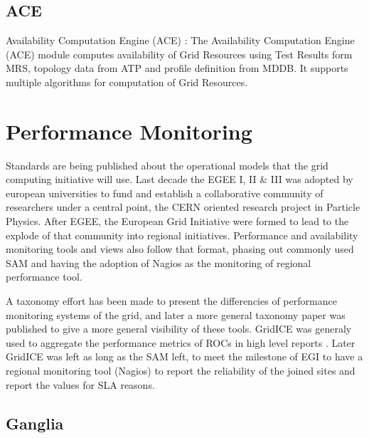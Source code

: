 \subsection{ACE}
Availability Computation Engine (ACE) : The Availability Computation Engine
(ACE) module computes availability of Grid Resources using Test Results form
MRS, topology data from ATP and profile definition from MDDB. It supports
multiple algorithms for computation of Grid Resources.



\section{Performance Monitoring}
Standards are being published about the operational models that the grid
computing initiative will use. Last decade the EGEE I, II \& III was adopted by
european universities to fund and establish a collaborative community of
researchers under a central point, the CERN oriented research project in
Particle Physics. After EGEE, the European Grid Initiative were formed to lead
to the explode of that community into regional initiatives. Performance
and availability monitoring tools and views also follow that format, phasing out
commonly used SAM \cite{egee3dsa122} and having the adoption of Nagios as the
monitoring of regional performance tool.


A taxonomy effort has been made \cite{gerndt2004performance} to present the
differencies of performance monitoring systems of the grid, and later a more
general \cite{zanikolas2007importance} taxonomy paper was published to give a
more general visibility of these tools. GridICE was generaly used to aggregate
the performance metrics of ROCs in high level reports
\cite{andreozzi2005gridice}. Later GridICE was left as long as the SAM left, to
meet the milestone of EGI to have a regional monitoring tool (Nagios) to report
the reliability of the joined sites and report the values for SLA reasons.

\subsection{Ganglia}

